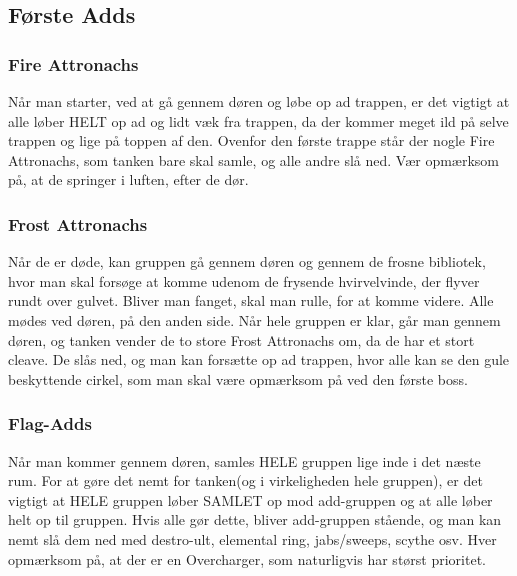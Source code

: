 \subsection{Første Adds}
\subsubsection*{Fire Attronachs}
Når man starter, ved at gå gennem døren og løbe op ad trappen, er det vigtigt
at alle løber HELT op ad og lidt væk fra trappen, da der kommer meget ild på
selve trappen og lige på toppen af den. Ovenfor den første trappe står der
nogle Fire Attronachs, som tanken bare skal samle, og alle andre slå ned. Vær
opmærksom på, at de springer i luften, efter de dør.
\subsubsection*{Frost Attronachs}
Når de er døde, kan gruppen gå gennem døren og gennem de frosne bibliotek, hvor
man skal forsøge at komme udenom de frysende hvirvelvinde, der flyver rundt
over gulvet. Bliver man fanget, skal man rulle, for at komme videre. Alle mødes
ved døren, på den anden side. Når hele gruppen er klar, går man gennem døren,
og tanken vender de to store Frost Attronachs om, da de har et stort cleave. De
slås ned, og man kan forsætte op ad trappen, hvor alle kan se den gule
beskyttende cirkel, som man skal være opmærksom på ved den første boss.
\subsubsection*{Flag-Adds}
Når man kommer gennem døren, samles HELE gruppen lige inde i det næste rum. For
at gøre det nemt for tanken(og i virkeligheden hele gruppen), er det vigtigt at
HELE gruppen løber SAMLET op mod add-gruppen og at alle løber helt op til
gruppen. Hvis alle gør dette, bliver add-gruppen stående, og man kan nemt slå dem
ned med destro-ult, elemental ring, jabs/sweeps, scythe osv. Hver opmærksom på,
at der er en Overcharger, som naturligvis har størst prioritet.

